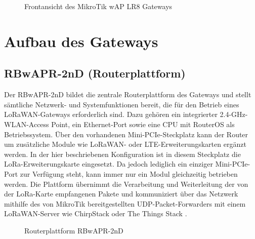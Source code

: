 	\begin{figure}[H]
		\centering
		\caption{Frontansicht des MikroTik wAP LR8 Gateways \cite{mikrotik:2020}}
	\end{figure}
	
\section{Aufbau des Gateways}
	\subsection{RBwAPR-2nD (Routerplattform)}
		Der RBwAPR-2nD bildet die zentrale Routerplattform des Gateways und stellt sämtliche Netzwerk- und Systemfunktionen bereit, die für den Betrieb eines LoRaWAN-Gateways erforderlich sind. Dazu gehören ein integrierter 2.4-GHz-WLAN-Access Point, ein Ethernet-Port sowie eine CPU mit RouterOS als Betriebssystem. Über den vorhandenen Mini-PCIe-Steckplatz kann der Router um zusätzliche Module wie LoRaWAN- oder LTE-Erweiterungskarten ergänzt werden. In der hier beschriebenen Konfiguration ist in diesem Steckplatz die LoRa-Erweiterungskarte eingesetzt. Da jedoch lediglich ein einziger Mini-PCIe-Port zur Verfügung steht, kann immer nur ein Modul gleichzeitig betrieben werden. Die Plattform übernimmt die Verarbeitung und Weiterleitung der von der LoRa-Karte empfangenen Pakete und kommuniziert über das Netzwerk mithilfe des von MikroTik bereitgestellten UDP-Packet-Forwarders mit einem LoRaWAN-Server wie ChirpStack oder The Things Stack \cite{mikrotik:2020}.
		
		\begin{figure}[H]
			\centering
			\caption{Routerplattform RBwAPR-2nD}
		\end{figure}
		
